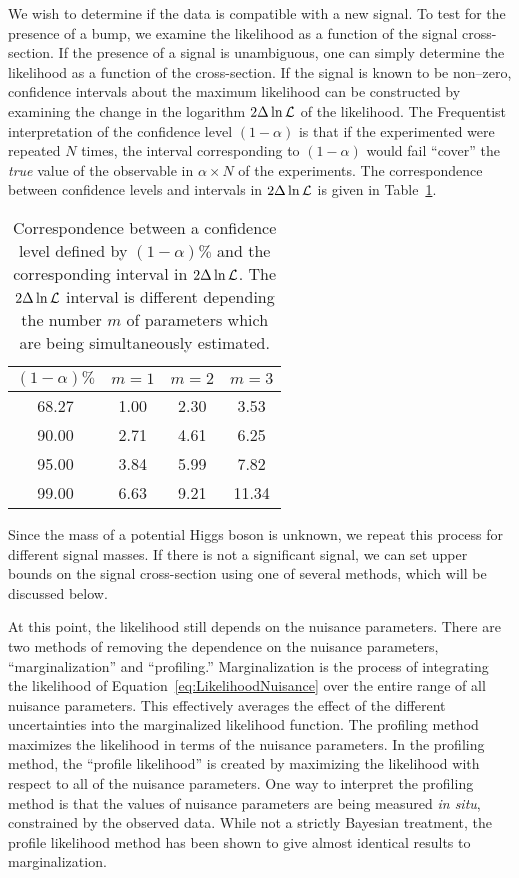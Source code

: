 We wish to determine if the data is compatible with a new signal.  To test for
the presence of a bump, we examine the likelihood as a function of the signal
cross-section.  If the presence of a signal is unambiguous, one can simply
determine the likelihood as a function of the cross-section.  If the signal is
known to be non--zero, confidence intervals about the maximum likelihood can be
constructed by examining the change in the logarithm $2\Delta \ln {\cal L}$ of
the likelihood.  The Frequentist interpretation of the
confidence level $(1-\alpha)$ is that if the experimented were repeated $N$
times, the interval corresponding to $(1-\alpha)$ would fail ``cover'' the
\emph{true} value of the observable in $\alpha \times N$ of the experiments.
The correspondence between confidence levels and intervals in $2\Delta \ln {\cal
L}$ is given in Table~\ref{tab:ConfidenceIntervals}.
\begin{table}
  \begin{center}
    \begin{tabular}{c|ccc} 
      $(1-\alpha)\%$ & $m = 1$ & $m = 2$ & $m = 3$ \\
      \hline
      68.27 & 1.00 & 2.30 & 3.53 \\
      90.00 & 2.71 & 4.61 & 6.25 \\
      95.00 & 3.84 & 5.99 & 7.82 \\
      99.00 & 6.63 & 9.21 & 11.34 \\
    \end{tabular}
    \caption[Correspondence of confidence levels and $2\Delta \ln {\cal L}$
    intervals]{Correspondence between a confidence level defined by
    $(1-\alpha)\%$ and the corresponding interval in $2\Delta \ln {\cal L}$.
    The $2\Delta \ln {\cal L}$ interval is different depending the number $m$ of
    parameters which are being simultaneously estimated.}
    \label{tab:ConfidenceIntervals}
  \end{center}
\end{table}
Since the mass of a potential Higgs boson is
unknown, we repeat this process for different signal masses.  If there is not a
significant signal, we can set upper bounds on the signal cross-section using
one of several methods, which will be discussed below.

At this point, the likelihood still depends on the nuisance parameters.  There
are two methods of removing the dependence on the nuisance parameters,
``marginalization'' and ``profiling.'' Marginalization is the process of
integrating the likelihood of Equation~\ref{eq:LikelihoodNuisance} over the
entire range of all nuisance parameters.  This effectively averages the effect
of the different uncertainties into the marginalized likelihood function.  The
profiling method maximizes the likelihood in terms of the nuisance
parameters.  In the profiling method, the ``profile likelihood'' is created by
maximizing the likelihood with respect to all of the nuisance parameters.  One
way to interpret the profiling method is that the values of nuisance parameters
are being measured \emph{in situ}, constrained by the observed data.  While not
a strictly Bayesian treatment, the profile likelihood method has been shown to
give almost identical results to marginalization.

